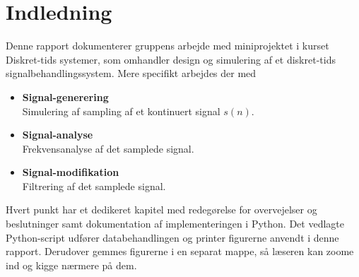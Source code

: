 \chapter{Indledning}
Denne rapport dokumenterer gruppens arbejde med miniprojektet i kurset Diskret-tids systemer, som omhandler design og simulering af et diskret-tids signalbehandlingssystem. Mere specifikt arbejdes der med
\begin{itemize}
\setlength\itemsep{0em}
\item \textbf{Signal-generering}\\
Simulering af sampling af et kontinuert signal $s(n)$.
\item \textbf{Signal-analyse}\\
Frekvensanalyse af det samplede signal.
\item \textbf{Signal-modifikation}\\
Filtrering af det samplede signal.
\end{itemize}

Hvert punkt har et dedikeret kapitel med redegørelse for overvejelser og beslutninger samt dokumentation af implementeringen i Python. Det vedlagte Python-script udfører databehandlingen og printer figurerne anvendt i denne rapport. Derudover gemmes figurerne i en separat mappe, så læseren kan zoome ind og kigge nærmere på dem.